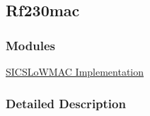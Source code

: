 \hypertarget{a00078}{}\subsection{Rf230mac}
\label{a00078}
\subsubsection*{Modules}
\begin{DoxyCompactItemize}
\item 
\hyperlink{a00069}{S\+I\+C\+S\+Lo\+W\+M\+A\+C Implementation}
\end{DoxyCompactItemize}


\subsubsection{Detailed Description}
